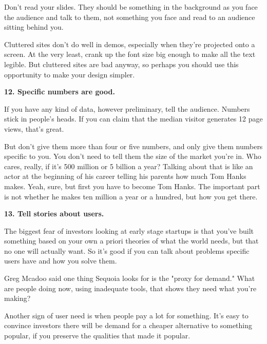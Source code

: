 Don't read your slides. They should
                    be something in the background as you face the audience and
                    talk to them, not something you face and read to an audience
                    sitting behind you.

Cluttered sites don't do well
                    in demos, especially when they're projected onto a screen.
                    At the very least, crank up the font size big enough to make
                    all the text legible. But cluttered sites are bad anyway, so
                    perhaps you should use this opportunity to make your design
                    simpler.

\textbf{12. Specific numbers are good.}

If you have any kind of data, however
                    preliminary, tell the audience. Numbers stick in people's
                    heads. If you can claim that the median visitor generates 12
                    page views, that's great.

But don't give them
                    more than four or five numbers, and only give them numbers
                    specific to you. You don't need to tell them the size of the
                    market you're in. Who cares, really, if it's 500 million or
                    5 billion a year? Talking about that is like an actor at the
                    beginning of his career telling his parents how much Tom
                    Hanks makes. Yeah, sure, but first you have to become Tom
                    Hanks. The important part is not whether he makes ten
                    million a year or a hundred, but how you get there.

\textbf{13. Tell stories about users.}

The biggest fear of investors looking at early
                    stage startups is that you've built something based on your
                    own a priori theories of what the world needs, but that no
                    one will actually want. So it's good if you can talk about
                    problems specific users have and how you solve them.

Greg
                    Mcadoo said one thing Sequoia looks for is the "proxy for
                    demand." What are people doing now, using inadequate tools,
                    that shows they need what you're making?

Another
                    sign of user need is when people pay a lot for something.
                    It's easy to convince investors there will be demand for a
                    cheaper alternative to something popular, if you preserve
                    the qualities that made it popular.

